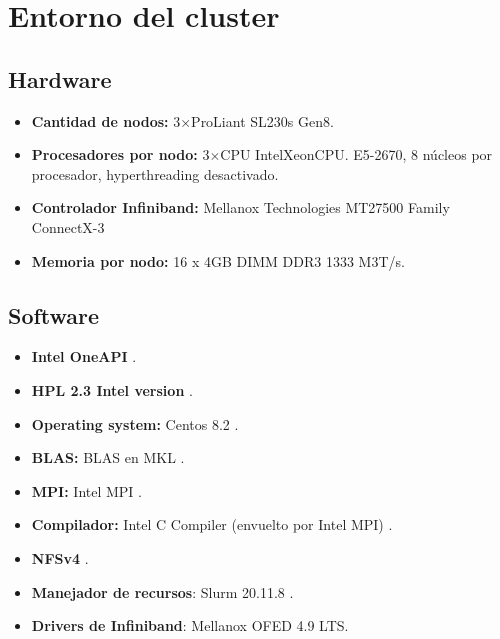 \section{Entorno del cluster}\label{OurOwnCluster}

\subsection{Hardware}\label{OurOwnCluster:HardwareEnvironment}
\begin{itemize}
	\item \textbf{Cantidad de nodos:} 3$\times$ProLiant SL230s Gen8.
	\item \textbf{Procesadores por nodo:} 3$\times$CPU Intel\textregistered Xeon\textregistered CPU.
    E5-2670, 8 núcleos por procesador, hyperthreading desactivado.
	\item \textbf{Controlador Infiniband: } Mellanox Technologies MT27500 Family ConnectX-3
	\item \textbf{Memoria por nodo:} 16 x 4GB DIMM DDR3 1333 M3T/s.
\end{itemize}

\subsection{Software}\label{OurOwnCluster:SoftwareEnvironment}

\begin{itemize}
    \item \textbf{Intel OneAPI} \cite{intel-oneapi}.
	\item \textbf{HPL 2.3 Intel version} \cite{intel-hplversion}.	
	\item \textbf{Operating system:} Centos 8.2 \cite{centos}.
	\item \textbf{BLAS:} BLAS en MKL \cite{intel-mkl-blas}.
	\item \textbf{MPI:} Intel MPI \cite{intel-mpi}.
    \item \textbf{Compilador:} Intel C Compiler (envuelto por Intel MPI) \cite{intel-compiler}.
	\item \textbf{NFSv4} \cite{nfs-tutorial}.
	\item \textbf{Manejador de recursos}: Slurm 20.11.8 \cite{slurm20-11-8}.
	\item \textbf{Drivers de Infiniband}: Mellanox OFED 4.9 LTS.
\end{itemize}
